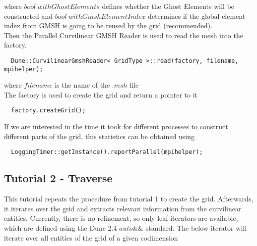 \noindent
where $bool\ withGhostElements$ defines whether the Ghost Elements will be constructed and $bool\ withGmshElementIndex$ determines if the global element index from GMSH is going to be reused by the grid (recommended). \\

\noindent
Then the Parallel Curvilinear GMSH Reader is used to read the mesh into the factory. \\

\begin{mybox}
\begin{lstlisting}
  Dune::CurvilinearGmshReader< GridType >::read(factory, filename, mpihelper); 
\end{lstlisting}
\end{mybox}

\noindent
where $filename$ is the name of the $.msh$ file \\

\noindent
The factory is used to create the grid and return a pointer to it \\
\begin{mybox}
\begin{lstlisting}
  factory.createGrid();
\end{lstlisting}
\end{mybox}

If we are interested in the time it took for different processes to construct different parts of the grid, this statistics can be obtained using \\

\begin{mybox}
\begin{lstlisting}
  LoggingTimer::getInstance().reportParallel(mpihelper);
\end{lstlisting}
\end{mybox}



\subsection{Tutorial 2 - Traverse}
\label{usage-howto-tutorial-traverse}

This tutorial repeats the procedure from tutorial 1 to create the grid. Afterwards, it iterates over the grid and extracts relevant information from the curvilinear entities. Currently, there is no refinement, so only leaf iterators are available, which are defined using the Dune 2.4 $auto \&\&$ standard. The below iterator will iterate over all entities of the grid of a given codimension \\

